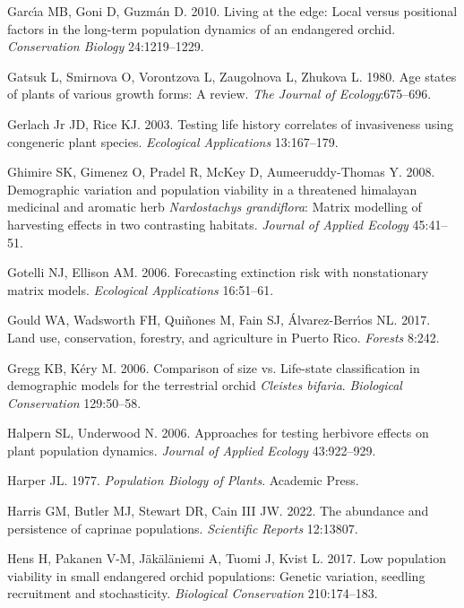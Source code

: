 \documentclass[
  12pt,
  letterpaper,
]{book}
\newlength{\cslhangindent}
\newenvironment{CSLReferences}[2] %
 {\begin{list}{}{%
  \setlength{\itemindent}{0pt}
  \setlength{\leftmargin}{0pt}
  \setlength{\parsep}{0pt}
  \ifodd #1
   \setlength{\leftmargin}{\cslhangindent}
   \setlength{\itemindent}{-1\cslhangindent}
  \fi
  \setlength{\itemsep}{#2\baselineskip}}}
 {\end{list}}
\begin{document}
\begin{CSLReferences}{1}{0}
Garcı́a MB, Goni D, Guzmán D. 2010. Living at the edge: Local versus
positional factors in the long-term population dynamics of an endangered
orchid. \emph{Conservation Biology} 24:1219--1229.

Gatsuk L, Smirnova O, Vorontzova L, Zaugolnova L, Zhukova L. 1980. Age
states of plants of various growth forms: A review. \emph{The Journal of
Ecology}:675--696.

Gerlach Jr JD, Rice KJ. 2003. Testing life history correlates of
invasiveness using congeneric plant species. \emph{Ecological
Applications} 13:167--179.

Ghimire SK, Gimenez O, Pradel R, McKey D, Aumeeruddy-Thomas Y. 2008.
Demographic variation and population viability in a threatened himalayan
medicinal and aromatic herb \emph{{N}ardostachys grandiflora}: Matrix
modelling of harvesting effects in two contrasting habitats.
\emph{Journal of Applied Ecology} 45:41--51.

Gotelli NJ, Ellison AM. 2006. Forecasting extinction risk with
nonstationary matrix models. \emph{Ecological Applications} 16:51--61.

Gould WA, Wadsworth FH, Quiñones M, Fain SJ, Álvarez-Berrı́os NL. 2017.
Land use, conservation, forestry, and agriculture in {P}uerto {R}ico.
\emph{Forests} 8:242.

Gregg KB, Kéry M. 2006. Comparison of size vs. Life-state classification
in demographic models for the terrestrial orchid \emph{{C}leistes
{b}ifaria}. \emph{Biological Conservation} 129:50--58.

Halpern SL, Underwood N. 2006. Approaches for testing herbivore effects
on plant population dynamics. \emph{Journal of Applied Ecology}
43:922--929.

Harper JL. 1977. \emph{Population {B}iology of {P}lants}. Academic
Press.

Harris GM, Butler MJ, Stewart DR, Cain III JW. 2022. The abundance and
persistence of caprinae populations. \emph{Scientific Reports} 12:13807.

Hens H, Pakanen V-M, Jäkäläniemi A, Tuomi J, Kvist L. 2017. Low
population viability in small endangered orchid populations: Genetic
variation, seedling recruitment and stochasticity. \emph{Biological
Conservation} 210:174--183.


\end{CSLReferences}
\end{document}
